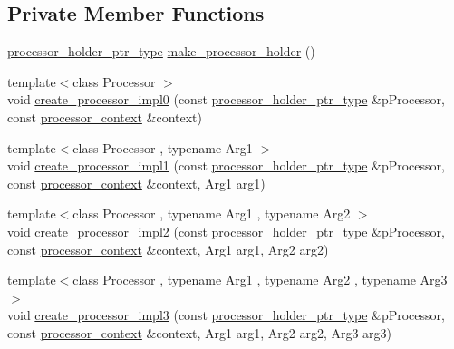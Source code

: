 \subsection*{Private Member Functions}
\begin{DoxyCompactItemize}
\item 
\mbox{\hyperlink{classboost_1_1statechart_1_1processor__container_a885e5a42694857bfaa44ec053ed20a57}{processor\+\_\+holder\+\_\+ptr\+\_\+type}} \mbox{\hyperlink{classboost_1_1statechart_1_1processor__container_a04c9968abd3eb95f1a6fcb171166c5f6}{make\+\_\+processor\+\_\+holder}} ()
\item 
{\footnotesize template$<$class Processor $>$ }\\void \mbox{\hyperlink{classboost_1_1statechart_1_1processor__container_abd000284faf4ed22dcc8a31214576f3e}{create\+\_\+processor\+\_\+impl0}} (const \mbox{\hyperlink{classboost_1_1statechart_1_1processor__container_a885e5a42694857bfaa44ec053ed20a57}{processor\+\_\+holder\+\_\+ptr\+\_\+type}} \&p\+Processor, const \mbox{\hyperlink{classboost_1_1statechart_1_1processor__container_1_1processor__context}{processor\+\_\+context}} \&context)
\item 
{\footnotesize template$<$class Processor , typename Arg1 $>$ }\\void \mbox{\hyperlink{classboost_1_1statechart_1_1processor__container_aa71e924b6ff8927f6227a79fa1b9eaff}{create\+\_\+processor\+\_\+impl1}} (const \mbox{\hyperlink{classboost_1_1statechart_1_1processor__container_a885e5a42694857bfaa44ec053ed20a57}{processor\+\_\+holder\+\_\+ptr\+\_\+type}} \&p\+Processor, const \mbox{\hyperlink{classboost_1_1statechart_1_1processor__container_1_1processor__context}{processor\+\_\+context}} \&context, Arg1 arg1)
\item 
{\footnotesize template$<$class Processor , typename Arg1 , typename Arg2 $>$ }\\void \mbox{\hyperlink{classboost_1_1statechart_1_1processor__container_a4374dc658b395822eec1043189b90ab1}{create\+\_\+processor\+\_\+impl2}} (const \mbox{\hyperlink{classboost_1_1statechart_1_1processor__container_a885e5a42694857bfaa44ec053ed20a57}{processor\+\_\+holder\+\_\+ptr\+\_\+type}} \&p\+Processor, const \mbox{\hyperlink{classboost_1_1statechart_1_1processor__container_1_1processor__context}{processor\+\_\+context}} \&context, Arg1 arg1, Arg2 arg2)
\item 
{\footnotesize template$<$class Processor , typename Arg1 , typename Arg2 , typename Arg3 $>$ }\\void \mbox{\hyperlink{classboost_1_1statechart_1_1processor__container_a980c59d8fe706a16906373841b911cac}{create\+\_\+processor\+\_\+impl3}} (const \mbox{\hyperlink{classboost_1_1statechart_1_1processor__container_a885e5a42694857bfaa44ec053ed20a57}{processor\+\_\+holder\+\_\+ptr\+\_\+type}} \&p\+Processor, const \mbox{\hyperlink{classboost_1_1statechart_1_1processor__container_1_1processor__context}{processor\+\_\+context}} \&context, Arg1 arg1, Arg2 arg2, Arg3 arg3)

\end{DoxyCompactItemize}
